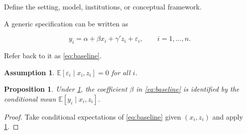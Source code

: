 \documentclass[11pt]{article}                 %
\newcommand{\E}{\mathbb{E}}                  %
\newtheorem{assumption}{Assumption}          %
\newtheorem{proposition}{Proposition}        %
\begin{document}
Define the setting, model, institutions, or conceptual framework.

A generic specification can be written as

\begin{equation}\label{eq:baseline}           %
    y_i = \alpha + \beta x_i + \gamma' z_i + \varepsilon_i,
    \qquad i=1,\ldots,n.
\end{equation}                                %


Refer back to it as \cref{eq:baseline}.

\begin{assumption}\label{as:exogeneity}       %
    $\E[\varepsilon_i \mid x_i, z_i] = 0$ for all $i$.
\end{assumption}

\begin{proposition}\label{prop:identification} %
    Under \cref{as:exogeneity}, the coefficient $\beta$ in \cref{eq:baseline} is identified by the conditional mean $\E[y_i \mid x_i, z_i]$.
\end{proposition}

\begin{proof}                                  %
    Take conditional expectations of \cref{eq:baseline} given $(x_i, z_i)$ and apply \cref{as:exogeneity}.
\end{proof}

\end{document}
